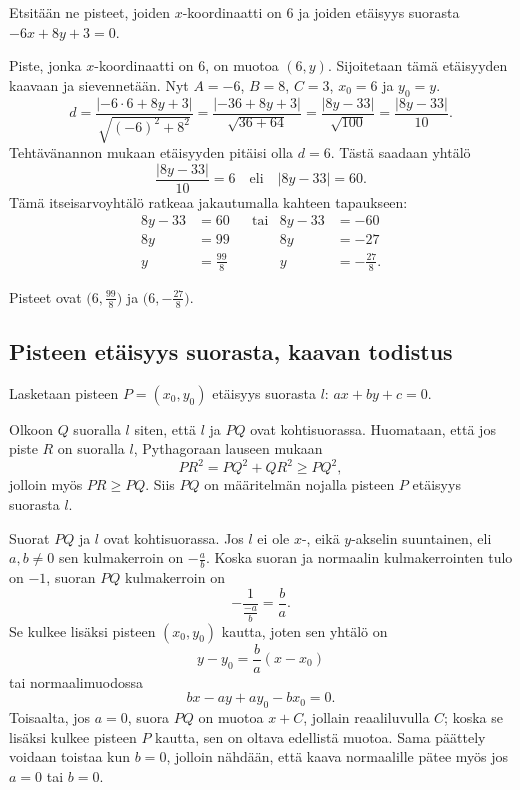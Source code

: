 \begin{esimerkki} Etsitään ne pisteet, joiden $x$-koordinaatti on 6 ja joiden etäisyys suorasta $-6x+8y+3=0$.
\begin{esimratk}
Piste, jonka $x$-koordinaatti on 6, on muotoa $(6, y)$. Sijoitetaan tämä etäisyyden kaavaan ja sievennetään.
Nyt $A=-6$, $B=8$, $C=3$, $x_0=6$ ja $y_0=y$.
\[
d=\frac{|-6\cdot 6+8y+3|}{\sqrt{(-6)^2+8^2}}
=\frac{|-36+8y+3|}{\sqrt{36+64}}
=\frac{|8y-33|}{\sqrt{100}}
=\frac{|8y-33|}{10}.
\]
Tehtävänannon mukaan etäisyyden pitäisi olla $d=6$. Tästä saadaan yhtälö
\[
\frac{|8y-33|}{10}=6 \quad \text{eli} \quad |8y-33|=60.
\]
Tämä itseisarvoyhtälö ratkeaa jakautumalla kahteen tapaukseen:
\begin{align*}
8y-33 & =60 & &\text{tai} & 8y-33 & =-60 \\
8y & =99 & & & 8y & =-27 \\
y & =\frac{99}{8} & & & y & =-\frac{27}{8}.
\end{align*}
\end{esimratk}
\begin{esimvast}
Pisteet ovat $\bigl(6, \frac{99}{8}\bigr)$ ja $\bigl(6, -\frac{27}{8}\bigr)$.
\end{esimvast}
\end{esimerkki}



\subsection*{Pisteen etäisyys suorasta, kaavan todistus}

Lasketaan pisteen $P = (x_0, y_0)$ etäisyys suorasta $l$: $ax+by+c=0$.

Olkoon $Q$ suoralla $l$ siten, että $l$ ja $PQ$ ovat kohtisuorassa. Huomataan, että jos piste $R$ on suoralla $l$, Pythagoraan lauseen mukaan
\[
PR^2 = PQ^2+QR^2 \geq PQ^2,
\]
jolloin myös $PR \geq PQ$. Siis $PQ$ on määritelmän nojalla pisteen $P$ etäisyys suorasta $l$.

Suorat $PQ$ ja $l$ ovat kohtisuorassa. Jos $l$ ei ole $x$-, eikä $y$-akselin suuntainen, eli $a,b \neq 0$ sen kulmakerroin on $-\frac{a}{b}$. Koska suoran ja normaalin kulmakerrointen tulo on $-1$, suoran $PQ$ kulmakerroin on
\[
-\frac{1}{\frac{-a}{b}} = \frac{b}{a}.
\]
Se kulkee lisäksi pisteen $(x_0,y_0)$ kautta, joten sen yhtälö on
\[
y-y_0 = \frac{b}{a}(x-x_0)
\]
tai normaalimuodossa
\[
bx-ay+ay_0-bx_0 = 0.
\]
Toisaalta, jos $a = 0$, suora $PQ$ on muotoa $x+C$, jollain reaaliluvulla $C$; koska se lisäksi kulkee pisteen $P$ kautta, sen on oltava edellistä muotoa. Sama päättely voidaan toistaa kun $b = 0$, jolloin nähdään, että kaava normaalille pätee myös jos $a = 0$ tai $b = 0$.

